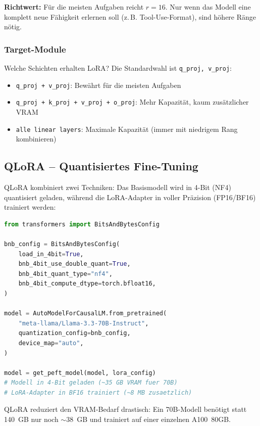 \textbf{Richtwert:} Für die meisten Aufgaben reicht $r = 16$. Nur wenn das Modell eine komplett neue Fähigkeit erlernen soll (z.\,B. Tool-Use-Format), sind höhere Ränge nötig.

\subsubsection{Target-Module}

Welche Schichten erhalten LoRA? Die Standardwahl ist \texttt{q\_proj, v\_proj}:

\begin{itemize}[leftmargin=*]
    \item \texttt{q\_proj + v\_proj}: Bewährt für die meisten Aufgaben
    \item \texttt{q\_proj + k\_proj + v\_proj + o\_proj}: Mehr Kapazität, kaum zusätzlicher VRAM
    \item \texttt{alle linear layers}: Maximale Kapazität (immer mit niedrigem Rang kombinieren)
\end{itemize}

\subsection{QLoRA -- Quantisiertes Fine-Tuning}

QLoRA kombiniert zwei Techniken: Das Basismodell wird in 4-Bit (NF4) quantisiert geladen, während die LoRA-Adapter in voller Präzision (FP16/BF16) trainiert werden:

\begin{lstlisting}[language=Python, caption=QLoRA -- Fine-Tuning eines quantisierten Modells]
from transformers import BitsAndBytesConfig

bnb_config = BitsAndBytesConfig(
    load_in_4bit=True,
    bnb_4bit_use_double_quant=True,
    bnb_4bit_quant_type="nf4",
    bnb_4bit_compute_dtype=torch.bfloat16,
)

model = AutoModelForCausalLM.from_pretrained(
    "meta-llama/Llama-3.3-70B-Instruct",
    quantization_config=bnb_config,
    device_map="auto",
)

model = get_peft_model(model, lora_config)
# Modell in 4-Bit geladen (~35 GB VRAM fuer 70B)
# LoRA-Adapter in BF16 trainiert (~8 MB zusaetzlich)
\end{lstlisting}

QLoRA reduziert den VRAM-Bedarf drastisch: Ein 70B-Modell benötigt statt 140~GB nur noch \(\sim 38\)~GB und trainiert auf einer einzelnen A100~80GB.

